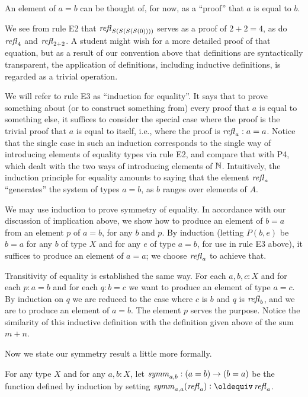 An element of $a=b$ can be thought of, for now, as a ``proof'' that $a$ is equal to $b$.

We see from rule E2 that $\mathop{{\it refl}_{S(S(S(S(0))))}}$ serves as a proof of $2+2=4$, as do $\mathop{{\it refl}_{4}}$ and $\mathop{{\it refl}_{2+2}}$.  A student might wish for a
more detailed proof of that equation, but as a result of our convention above that definitions are syntactically transparent, the application of
definitions, including inductive definitions, is regarded as a trivial operation.

We will refer to rule E3 as ``induction for equality''.  It says that to prove something about (or to construct something from) every proof that
$a$ is equal to something else, it suffices to consider the special case where the proof is the trivial proof that $a$ is equal to itself, i.e.,
where the proof is $\mathop{{\it refl}_{a}} : a=a$.  Notice that the single case in such an induction corresponds to the single way of introducing elements of
equality types via rule E2, and compare that with P4, which dealt with the two ways of introducing elements of $\mathbb{N}$.
Intuitively, the induction principle for equality amounts to saying that the element $\mathop{{\it refl}_{a}}$ ``generates'' the system of types $a=b$, as $b$
ranges over elements of $A$.

We may use induction to prove symmetry of equality.  In accordance with our discussion of implication above, we show how to produce an element
of $b=a$ from an element $p$ of $a=b$, for any $b$ and $p$.  By induction (letting $P(b,e)$ be $b=a$ for any $b$ of type $X$ and for any $e$ of
type $a=b$, for use in rule E3 above), it suffices to produce an element of $a=a$; we choose $\mathop{{\it refl}_{a}}$ to achieve that.

Transitivity of equality is established the same way.  For each $a,b,c:X$ and for each $p:a=b$ and for each $q:b=c$ we want to produce an
element of type $a=c$.  By induction on $q$ we are reduced to the case where $c$ is $b$ and $q$ is $\mathop{{\it refl}_{b}}$, and we are to produce an element
of $a=b$.  The element $p$ serves the purpose.  Notice the similarity of this inductive definition with the definition given above of the sum
$m+n$.

Now we state our symmetry result a little more formally.

\begin{definition}
  For any type $X$ and for any $a,b:X$, let $\mathop{\mathit{symm}}_{a,b} : (a=b) \to (b=a)$ be the function defined by induction by setting 
  $\symm_{a,a}(\refl a) \defeq \refl a$.
\end{definition}

